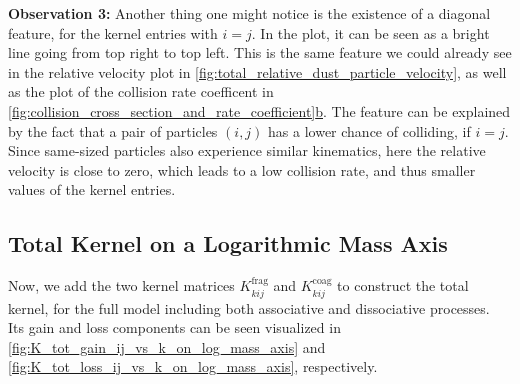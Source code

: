         \textbf{Observation 3:} Another thing one might notice is the existence of a 
        diagonal feature, for the kernel entries with $i=j$. In the plot, it can be seen as a
        bright line going from top right to top left. This is the same feature we could already see 
        in the relative velocity plot in \cref{fig:total_relative_dust_particle_velocity}, 
        as well as the plot of the collision rate coefficent in 
        \hyperref[fig:collision_cross_section_and_rate_coefficient]
        {\cref*{fig:collision_cross_section_and_rate_coefficient}b}.
        The feature can be explained by the fact that a pair of particles $(i,j)$ has a lower 
        chance of colliding, if $i = j$. Since same-sized particles also experience similar 
        kinematics, here the relative velocity is close to zero, which leads to a low 
        collision rate, and thus smaller values of the kernel entries. 



    \clearpage
    \subsection{Total Kernel on a Logarithmic Mass Axis}
        
        Now, we add the two kernel matrices $K_{kij}^\text{frag}$ and $K_{kij}^\text{coag}$
        to construct the total kernel, for the full model including both associative and 
        dissociative processes. \\

        Its gain and loss components can be seen visualized in 
        \cref{fig:K_tot_gain_ij_vs_k_on_log_mass_axis} and 
        \cref{fig:K_tot_loss_ij_vs_k_on_log_mass_axis}, respectively. \\


